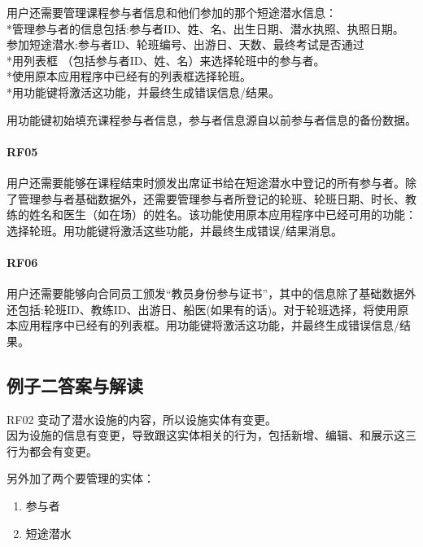 用户还需要管理课程参与者信息和他们参加的那个短途潜水信息：\\
*管理参与者的信息包括:参与者ID、姓、名、出生日期、潜水执照、执照日期。\\
参加短途潜水:参与者ID、轮班编号、出游日、天数、最终考试是否通过\\
*用列表框 （包括参与者ID、姓、名）来选择轮班中的参与者。\\
*使用原本应用程序中已经有的列表框选择轮班。\\
*用功能键将激活这功能，并最终生成错误信息/结果。

用功能键初始填充课程参与者信息，参与者信息源自以前参与者信息的备份数据。

\hypertarget{rf05-1}{%
\paragraph{RF05}\label{rf05-1}}

用户还需要能够在课程结束时颁发出席证书给在短途潜水中登记的所有参与者。除了管理参与者基础数据外，还需要管理参与者所登记的轮班、轮班日期、时长、教练的姓名和医生（如在场）的姓名。该功能使用原本应用程序中已经可用的功能：选择轮班。用功能键将激活这些功能，并最终生成错误/结果消息。

\hypertarget{rf06}{%
\paragraph{RF06}\label{rf06}}

用户还需要能够向合同员工颁发``教员身份参与证书''，其中的信息除了基础数据外还包括:轮班ID、教练ID、出游日、船医(如果有的话)。对于轮班选择，将使用原本应用程序中已经有的列表框。用功能键将激活这功能，并最终生成错误信息/结果。

\hypertarget{ux4f8bux5b50ux4e8cux7b54ux6848ux4e0eux89e3ux8bfb}{%
\subsection{例子二答案与解读}\label{ux4f8bux5b50ux4e8cux7b54ux6848ux4e0eux89e3ux8bfb}}

RF02 变动了潜水设施的内容，所以设施实体有变更。\\
因为设施的信息有变更，导致跟这实体相关的行为，包括新增、编辑、和展示这三行为都会有变更。

另外加了两个要管理的实体：

\begin{enumerate}
\tightlist
\item
  参与者
\item
  短途潜水
\end{enumerate}

